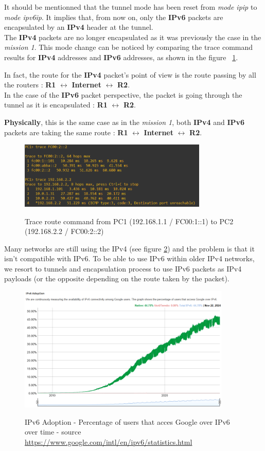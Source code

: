 \documentclass[10pt,a4paper]{ULBreport}
\begin{document}
It should be mentionned that the tunnel mode has been reset from \textit{mode ipip} to \textit{mode ipv6ip}.
It implies that, from now on, only the \textbf{IPv6} packets are encapsulated by an \textbf{IPv4}  header at the tunnel. \\
The \textbf{IPv4} packets are no longer encapsulated as it was previously the case in the \textit{mission 1}.
This mode change can be noticed by comparing the trace command results for \textbf{IPv4} addresses and \textbf{IPv6} addresses, as shown in the figure ~\ref{fig:Images/Question_4_Difference_IPv4_IPv6}. \par
In fact, the route for the \textbf{IPv4} packet's point of view is the route passing by all the routers : \textbf{R1} $\leftrightarrow$ \textbf{Internet} $\leftrightarrow$ \textbf{R2}. \\
In the case of the \textbf{IPv6} packet perspective, the packet is going through the tunnel as it is encapsulated : \textbf{R1} $\leftrightarrow$ \textbf{R2}. \par
\textbf{Physically}, this is the same case as in the \textit{mission 1}, both \textbf{IPv4} and \textbf{IPv6} packets are taking the same route : \textbf{R1} $\leftrightarrow$ \textbf{Internet} $\leftrightarrow$ \textbf{R2}.

\begin{figure}[H]
  \caption{Trace route command from PC1 (192.168.1.1 / FC00:1::1) to PC2 (192.168.2.2 / FC00:2::2)}
  \centering
  \includegraphics[width=0.8\textwidth]{Images/Question_4_Difference_IPv4_IPv6.png}
  \label{fig:Images/Question_4_Difference_IPv4_IPv6}
\end{figure}



Many networks are still using the IPv4 (see figure \ref{ipv6adop}) and the problem is that it isn't compatible with IPv6. To be able to use IPv6 within older IPv4 networks, we resort to tunnels and encapsulation process to use IPv6 packets as IPv4 payloads (or the opposite depending on the route taken by the packet).

\begin{figure}[H]
    \caption{IPv6 Adoption - Percentage of users that acces Google over IPv6 over time - source \url{https://www.google.com/intl/en/ipv6/statistics.html} }
    \centering
    \includegraphics[width=0.9\textwidth]{Images/Ipv6adop.png}
    \label{ipv6adop}
  \end{figure}
\end{document}
